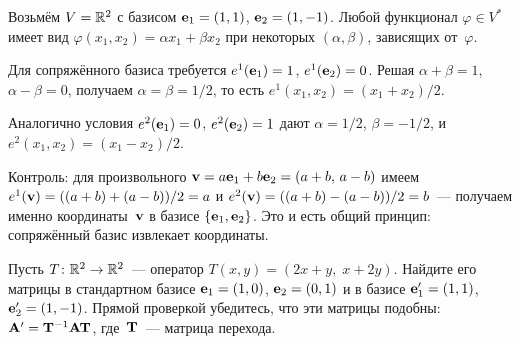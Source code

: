 \begin{example}
\label{ex:dual-basis-numeric}
Возьмём $V = \mathbb{R}^2$ с базисом $\mathbf{e}_1 = (1, 1)$,
$\mathbf{e}_2 = (1, -1)$. Любой функционал $\varphi \in V^{*}$ имеет вид
$\varphi(x_1, x_2) = \alpha x_1 + \beta x_2$ при некоторых
$(\alpha, \beta)$, зависящих от~$\varphi$.

Для сопряжённого базиса требуется $e^1(\mathbf{e}_1) = 1$,
$e^1(\mathbf{e}_2) = 0$. Решая $\alpha + \beta = 1$, $\alpha - \beta = 0$,
получаем $\alpha = \beta = 1/2$, то есть
$e^1(x_1, x_2) = (x_1 + x_2)/2$.

Аналогично условия $e^2(\mathbf{e}_1) = 0$, $e^2(\mathbf{e}_2) = 1$ дают
$\alpha = 1/2$, $\beta = -1/2$, и $e^2(x_1, x_2) = (x_1 - x_2)/2$.

Контроль: для произвольного $\mathbf{v} = a \mathbf{e}_1 + b \mathbf{e}_2 = (a + b,\, a - b)$
имеем $e^1(\mathbf{v}) = ((a + b) + (a - b))/2 = a$ и
$e^2(\mathbf{v}) = ((a + b) - (a - b))/2 = b$~--- получаем именно
координаты~$\mathbf{v}$ в базисе $\{\mathbf{e}_1, \mathbf{e}_2\}$. Это и есть
общий принцип: сопряжённый базис извлекает координаты.
\end{example}

\begin{problem}
\label{prob:operator-similarity}
Пусть $T \colon \mathbb{R}^2 \to \mathbb{R}^2$~--- оператор
$T(x, y) = (2x + y,\; x + 2y)$. Найдите его матрицы в стандартном
базисе $\mathbf{e}_1 = (1, 0)$, $\mathbf{e}_2 = (0, 1)$ и в базисе
$\mathbf{e}'_1 = (1, 1)$, $\mathbf{e}'_2 = (1, -1)$. Прямой проверкой
убедитесь, что эти матрицы подобны: $\mathbf{A}' = \mathbf{T}^{-1}\mathbf{A}\mathbf{T}$,
где~$\mathbf{T}$~--- матрица перехода.
\end{problem}

